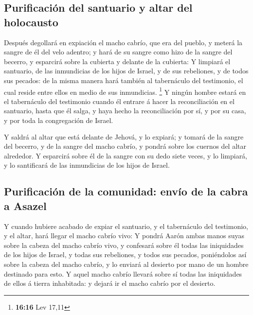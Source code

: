 \hypertarget{purificaciuxf3n-del-santuario-y-altar-del-holocausto}{%
\subsection{Purificación del santuario y altar del
holocausto}\label{purificaciuxf3n-del-santuario-y-altar-del-holocausto}}

 Después degollará en expiación el macho cabrío, que era
del pueblo, y meterá la sangre de él del velo adentro; y hará de su
sangre como hizo de la sangre del becerro, y esparcirá sobre la cubierta
y delante de la cubierta:  Y limpiará el santuario, de
las inmundicias de los hijos de Israel, y de sus rebeliones, y de todos
sus pecados: de la misma manera hará también al tabernáculo del
testimonio, el cual reside entre ellos en medio de sus inmundicias.
\footnote{\textbf{16:16} Lev 17,11}  Y ningún hombre
estará en el tabernáculo del testimonio cuando él entrare á hacer la
reconciliación en el santuario, hasta que él salga, y haya hecho la
reconciliación por sí, y por su casa, y por toda la congregación de
Israel.

 Y saldrá al altar que está delante de Jehová, y lo
expiará; y tomará de la sangre del becerro, y de la sangre del macho
cabrío, y pondrá sobre los cuernos del altar alrededor. 
Y esparcirá sobre él de la sangre con su dedo siete veces, y lo
limpiará, y lo santificará de las inmundicias de los hijos de Israel.

\hypertarget{purificaciuxf3n-de-la-comunidad-envuxedo-de-la-cabra-a-asazel}{%
\subsection{Purificación de la comunidad: envío de la cabra a
Asazel}\label{purificaciuxf3n-de-la-comunidad-envuxedo-de-la-cabra-a-asazel}}

 Y cuando hubiere acabado de expiar el santuario, y el
tabernáculo del testimonio, y el altar, hará llegar el macho cabrío
vivo:  Y pondrá Aarón ambas manos suyas sobre la cabeza
del macho cabrío vivo, y confesará sobre él todas las iniquidades de los
hijos de Israel, y todas sus rebeliones, y todos sus pecados,
poniéndolos así sobre la cabeza del macho cabrío, y lo enviará al
desierto por mano de un hombre destinado para esto.  Y
aquel macho cabrío llevará sobre sí todas las iniquidades de ellos á
tierra inhabitada: y dejará ir el macho cabrío por el desierto.

